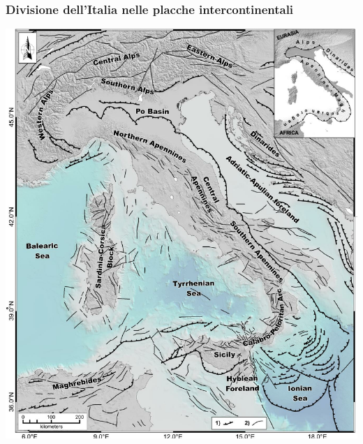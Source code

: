 \begin{frame}
	\frametitle{Divisione dell'Italia nelle placche intercontinentali}
	\hspace{1em}
	\includegraphics[keepaspectratio=true,height=0.8\paperheight]{italy-tectonic-map}
\end{frame}